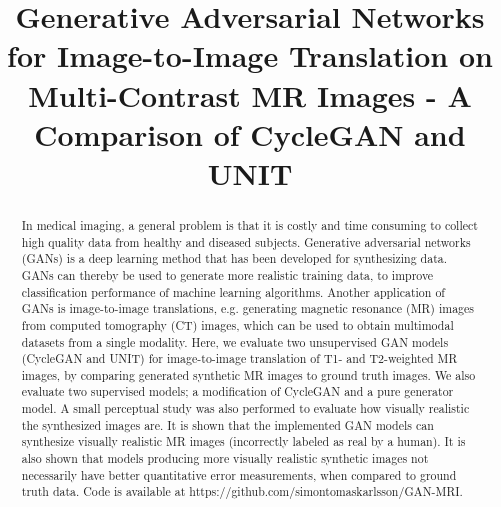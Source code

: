 \documentclass{article}
\title{Generative Adversarial Networks for Image-to-Image Translation on Multi-Contrast MR Images - A Comparison of CycleGAN and UNIT}
\begin{document}
\maketitle

\thispagestyle{plain}
\pagestyle{plain}

\begin{abstract}

In medical imaging, a general problem is that it is costly and time consuming to collect high quality data from healthy and diseased subjects. Generative adversarial networks (GANs) is a deep learning method that has been developed for synthesizing data. GANs can thereby be used to generate more realistic training data, to improve classification performance of machine learning algorithms. Another application of GANs is image-to-image translations, e.g. generating magnetic resonance (MR) images from computed tomography (CT) images, which can be used to obtain multimodal datasets from a single modality. Here, we evaluate two unsupervised GAN models (CycleGAN and UNIT) for image-to-image translation of T1- and T2-weighted MR images, by comparing generated synthetic MR images to ground truth images. We also evaluate two supervised models; a modification of CycleGAN and a pure generator model. A small perceptual study was also performed to evaluate how visually realistic the synthesized images are. It is shown that the implemented GAN models can synthesize visually realistic MR images (incorrectly labeled as real by a human). It is also shown that models producing more visually realistic synthetic images not necessarily have better quantitative error measurements, when compared to ground truth data. Code is available at https://github.com/simontomaskarlsson/GAN-MRI.

\end{abstract}
\end{document}
